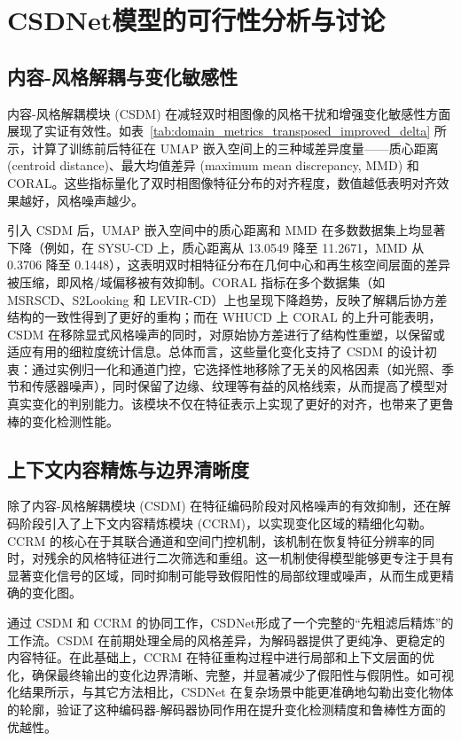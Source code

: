 \section{CSDNet模型的可行性分析与讨论}

\subsection{内容-风格解耦与变化敏感性}
内容-风格解耦模块 (CSDM) 在减轻双时相图像的风格干扰和增强变化敏感性方面展现了实证有效性。如表~\ref{tab:domain_metrics_transposed_improved_delta} 所示，计算了训练前后特征在 UMAP 嵌入空间上的三种域差异度量——质心距离 (centroid distance)、最大均值差异 (maximum mean discrepancy, MMD) 和 CORAL。这些指标量化了双时相图像特征分布的对齐程度，数值越低表明对齐效果越好，风格噪声越少。

引入 CSDM 后，UMAP 嵌入空间中的质心距离和 MMD 在多数数据集上均显著下降（例如，在 SYSU-CD 上，质心距离从 13.0549 降至 11.2671，MMD 从 0.3706 降至 0.1448），这表明双时相特征分布在几何中心和再生核空间层面的差异被压缩，即风格/域偏移被有效抑制。CORAL 指标在多个数据集（如 MSRSCD、S2Looking 和 LEVIR-CD）上也呈现下降趋势，反映了解耦后协方差结构的一致性得到了更好的重构；而在 WHUCD 上 CORAL 的上升可能表明，CSDM 在移除显式风格噪声的同时，对原始协方差进行了结构性重塑，以保留或适应有用的细粒度统计信息。总体而言，这些量化变化支持了 CSDM 的设计初衷：通过实例归一化和通道门控，它选择性地移除了无关的风格因素（如光照、季节和传感器噪声），同时保留了边缘、纹理等有益的风格线索，从而提高了模型对真实变化的判别能力。该模块不仅在特征表示上实现了更好的对齐，也带来了更鲁棒的变化检测性能。

\subsection{上下文内容精炼与边界清晰度}
除了内容-风格解耦模块 (CSDM) 在特征编码阶段对风格噪声的有效抑制，还在解码阶段引入了上下文内容精炼模块 (CCRM)，以实现变化区域的精细化勾勒。CCRM 的核心在于其联合通道和空间门控机制，该机制在恢复特征分辨率的同时，对残余的风格特征进行二次筛选和重组。这一机制使得模型能够更专注于具有显著变化信号的区域，同时抑制可能导致假阳性的局部纹理或噪声，从而生成更精确的变化图。

通过 CSDM 和 CCRM 的协同工作，CSDNet形成了一个完整的“先粗滤后精炼”的工作流。CSDM 在前期处理全局的风格差异，为解码器提供了更纯净、更稳定的内容特征。在此基础上，CCRM 在特征重构过程中进行局部和上下文层面的优化，确保最终输出的变化边界清晰、完整，并显著减少了假阳性与假阴性。如可视化结果所示，与其它方法相比，CSDNet 在复杂场景中能更准确地勾勒出变化物体的轮廓，验证了这种编码器-解码器协同作用在提升变化检测精度和鲁棒性方面的优越性。


